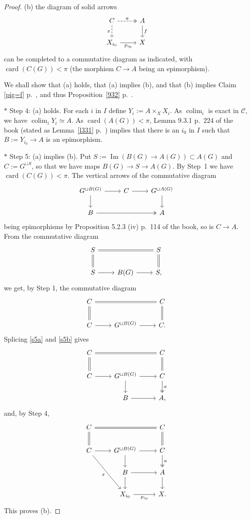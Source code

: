 \documentclass[12pt]{article}%
\theoremstyle{remark}
\theoremstyle{definition}
\newcommand{\nn}{\noindent}
\newcommand{\C}{\mathcal C}
\DeclareMathOperator*{\colim}{colim}%
\DeclareMathOperator{\card}{card}%
\DeclareMathOperator{\Ima}{Im}
\begin{document}
\begin{proof}
\nn(b) the diagram of solid arrows 
%
\begin{equation}\label{fa}
\begin{tikzcd}
C\ar[dashed,two heads]{r}{a}\ar[dashed]{d}[swap]{x}&A\ar{d}{f}\\ 
X_{i_0}\ar{r}[swap]{p_{i_0}}&X
\end{tikzcd}
\end{equation}
%
can be completed to a commutative diagram as indicated, with $\card(C(G))<\pi$ (the morphism $C\to A$ being an epimorphism).

We shall show that (a) holds, that (a) implies (b), and that (b) implies Claim \ref{pig=f} p.~\pageref{pig=f}, and thus Proposition~\ref{932} p.~\pageref{932}. 

\nn$*$ Step 4: (a) holds. For each $i$ in $I$ define $Y_i:=A\times_XX_i$. As $\colim_i$ is exact in $\C$, we have $\colim_iY_i\simeq A$. As $\card(A(G))<\pi$, Lemma 9.3.1 p.~224 of the book (stated as Lemma~\ref{l331} p.~\pageref{l331}) implies that there is an $i_0$ in $I$ such that $B:=Y_{i_0}\to A$ is an epimorphism.

\nn$*$ Step 5: (a) implies (b). Put $S:=\Ima(B(G)\to A(G))\subset A(G)$ and $C:=G^{\sqcup S}$, so that we have maps $B(G)\to S\to A(G)$. By Step~1 we have $\card(C(G))<\pi$. The vertical arrows of the commutative diagram 
\begin{equation}\label{s5a}
\begin{tikzcd}
G^{\sqcup B(G)}\ar{r}\ar{d}&C\ar{r}&G^{\sqcup A(G)}\ar{d}\\ 
B\ar[two heads]{rr}&&A
\end{tikzcd}
\end{equation} 
being epimorphisms by Proposition 5.2.3 (iv) p.~114 of the book, so is $C\to A$. From the commutative diagram 
$$
\begin{tikzcd}
S\ar[equal]{rr}\ar[equal]{d}&&S\ar[equal]{d}\\ 
S\ar{r}&B(G)\ar{r}&S,
\end{tikzcd}
$$ 
we get, by Step 1, the commutative diagram 
\begin{equation}\label{s5b}
\begin{tikzcd}
C\ar[equal]{rr}\ar[equal]{d}&&C\ar[equal]{d}\\ 
C\ar{r}&G^{\sqcup B(G)}\ar{r}&C.
\end{tikzcd}
\end{equation} 
Splicing \eqref{s5a} and \eqref{s5b} gives 
$$
\begin{tikzcd}
C\ar[equal]{rr}\ar[equal]{d}&&C\ar[equal]{d}\\ 
C\ar{r}&G^{\sqcup B(G)}\ar{r}\ar{d}&C\ar[two heads]{d}{a}\\ 
{}&B\ar{r}&A,
\end{tikzcd}
$$ 
and, by Step 4,
$$
\begin{tikzcd}
C\ar[equal]{rr}\ar[equal]{d}&&C\ar[equal]{d}\\ 
C\ar{r}\ar{rdd}[swap]{x}&G^{\sqcup B(G)}\ar{r}\ar{d}&C\ar[two heads]{d}{a}\\ 
{}&B\ar{r}\ar{d}&A\ar{d}\\ 
{}&X_{i_0}\ar{r}[swap]{p_{i_0}}&X.
\end{tikzcd}
$$ 
This proves (b).


\end{proof}
\end{document}
